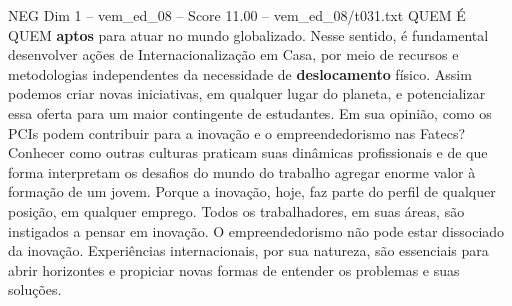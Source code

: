 \begin{textsample}{NEG Dim 1 – vem\_ed\_08 – Score 11.00 – vem\_ed\_08/t031.txt}  \label{ex:f1_neg_124}
QUEM É QUEM \textbf{aptos} para atuar no mundo globalizado.
Nesse sentido, é fundamental desenvolver ações de Internacionalização em Casa, por meio de recursos e metodologias independentes da necessidade de \textbf{deslocamento} físico.
Assim podemos criar novas iniciativas, em qualquer lugar do planeta, e potencializar essa oferta para um maior contingente de estudantes.
Em sua opinião, como os PCIs podem contribuir para a inovação e o empreendedorismo nas Fatecs?
Conhecer como outras culturas praticam suas dinâmicas profissionais e de que forma interpretam os desafios do mundo do trabalho agregar enorme valor à formação de um jovem.
Porque a inovação, hoje, faz parte do perfil de qualquer posição, em qualquer emprego.
Todos os trabalhadores, em suas áreas, são instigados a pensar em inovação.
O empreendedorismo não pode estar dissociado da inovação.
Experiências internacionais, por sua natureza, são essenciais para abrir horizontes e propiciar novas formas de entender os problemas e suas soluções.

\end{textsample}

